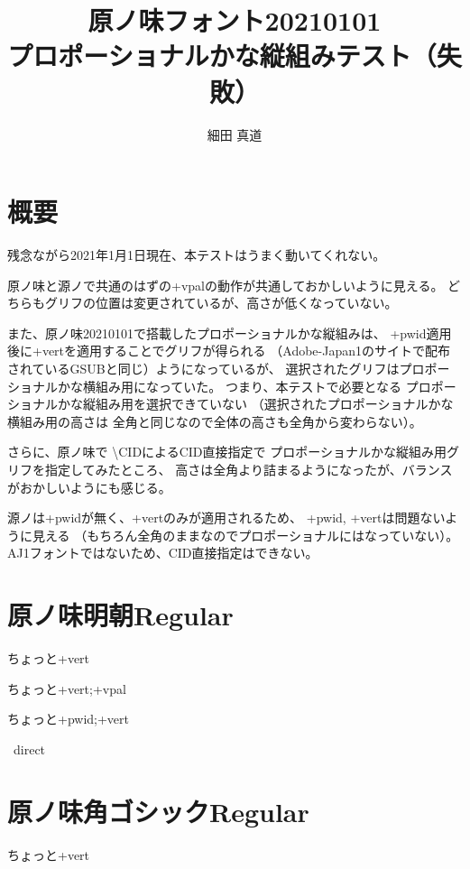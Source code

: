 \documentclass[tate,paper={297mm,210mm}]{jlreq}
\title{原ノ味フォント20210101 \\ プロポーショナルかな縦組みテスト（失敗）}
\author{細田 真道}
\begin{document}
\maketitle

\section*{概要}

残念ながら2021年1月1日現在、本テストはうまく動いてくれない。

原ノ味と源ノで共通のはずの+vpalの動作が共通しておかしいように見える。
どちらもグリフの位置は変更されているが、高さが低くなっていない。

また、原ノ味20210101で搭載したプロポーショナルかな縦組みは、
+pwid適用後に+vertを適用することでグリフが得られる
（Adobe-Japan1のサイトで配布されているGSUBと同じ）ようになっているが、
選択されたグリフはプロポーショナルかな横組み用になっていた。
つまり、本テストで必要となる
プロポーショナルかな縦組み用を選択できていない
（選択されたプロポーショナルかな横組み用の高さは
  全角と同じなので全体の高さも全角から変わらない）。

さらに、原ノ味で \textbackslash CIDによるCID直接指定で
プロポーショナルかな縦組み用グリフを指定してみたところ、
高さは全角より詰まるようになったが、バランスがおかしいようにも感じる。

源ノは+pwidが無く、+vertのみが適用されるため、
+pwid, +vertは問題ないように見える
（もちろん全角のままなのでプロポーショナルにはなっていない）。
AJ1フォントではないため、CID直接指定はできない。

\clearpage

\section*{原ノ味明朝Regular}

\hmrnone\hbox{\tate\vrule ちょっと\vrule +vert}

\hmrvpal\hbox{\tate\vrule ちょっと\vrule +vert;+vpal}

\hmrpwidvert\hbox{\tate\vrule ちょっと\vrule +pwid;+vert}

\hmrnone\hbox{\tate\vrule%
  \vrule direct}

\section*{原ノ味角ゴシックRegular}

\hgrnone\hbox{\tate\vrule ちょっと\vrule +vert}
\end{document}
